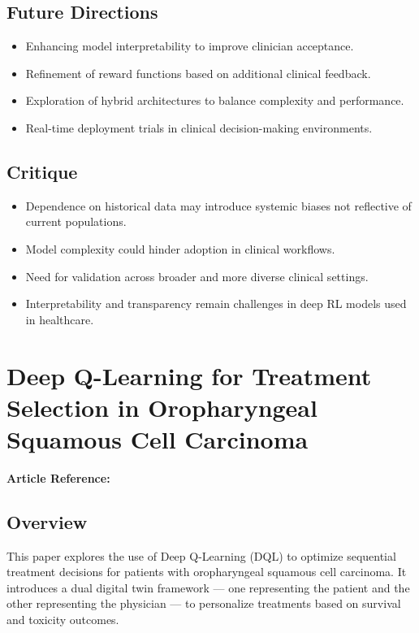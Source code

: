 \subsection*{Future Directions}
\begin{itemize}
    \item Enhancing model interpretability to improve clinician acceptance.
    \item Refinement of reward functions based on additional clinical feedback.
    \item Exploration of hybrid architectures to balance complexity and performance.
    \item Real-time deployment trials in clinical decision-making environments.
\end{itemize}

\subsection*{Critique}
\begin{itemize}
    \item Dependence on historical data may introduce systemic biases not reflective of current populations.
    \item Model complexity could hinder adoption in clinical workflows.
    \item Need for validation across broader and more diverse clinical settings.
    \item Interpretability and transparency remain challenges in deep RL models used in healthcare.
\end{itemize}

\section{Deep Q-Learning for Treatment Selection in Oropharyngeal Squamous Cell Carcinoma}
\textbf{Article Reference:} \cite{article_17}

\subsection*{Overview}
This paper explores the use of Deep Q-Learning (DQL) to optimize sequential treatment decisions for patients with oropharyngeal squamous cell carcinoma. It introduces a dual digital twin framework — one representing the patient and the other representing the physician — to personalize treatments based on survival and toxicity outcomes.

